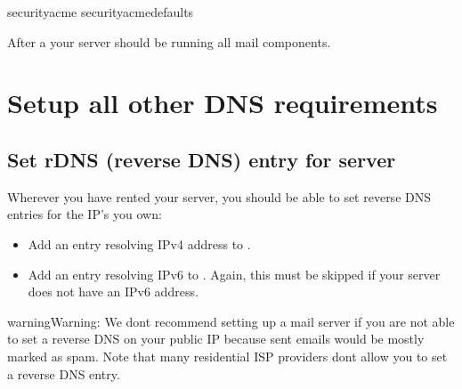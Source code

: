 \documentclass[letterpaper,10pt,english]{sphinxmanual}
\begin{document}
\begin{sphinxVerbatim}[commandchars=\\\{\}]
      
  securityacme  
  securityacmedefaults  
\end{sphinxVerbatim}

\sphinxAtStartPar
After a  your server should be running all
mail components.


\section{Setup all other DNS requirements}
\label{\detokenize{quickstart:setup-all-other-dns-requirements}}

\subsection{Set rDNS (reverse DNS) entry for server}
\label{\detokenize{quickstart:set-rdns-reverse-dns-entry-for-server}}
\sphinxAtStartPar
Wherever you have rented your server, you should be able to set reverse
DNS entries for the IP’s you own:
\begin{itemize}
\item {} 
\sphinxAtStartPar
Add an entry resolving IPv4 address  to .

\item {} 
\sphinxAtStartPar
Add an entry resolving IPv6  to . Again, this
must be skipped if your server does not have an IPv6 address.

\end{itemize}

\begin{sphinxadmonition}{warning}{Warning:}
\sphinxAtStartPar
We don\textquotesingle{}t recommend setting up a mail server if you are not able to
set a reverse DNS on your public IP because sent emails would be
mostly marked as spam. Note that many residential ISP providers
don\textquotesingle{}t allow you to set a reverse DNS entry.
\end{sphinxadmonition}
\end{document}

